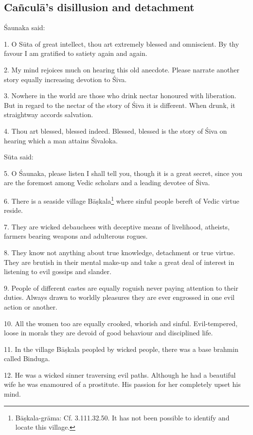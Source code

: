 {}
\subsection*{Cañculā’s disillusion and detachment}

Śaunaka said:

1. O Sūta of great intellect, thou art extremely blessed and omniscient. By thy
favour I am gratified to satiety again and again.

2. My mind rejoices much on hearing this old anecdote. Please narrate another
story equally increasing devotion to Śiva.

3. Nowhere in the world are those who drink nectar honoured with liberation. But
in regard to the nectar of the story of Śiva it is different. When drunk, it
straightway accords salvation.

4. Thou art blessed, blessed indeed. Blessed, blessed is the story of Śiva on
hearing which a man attains Śivaloka.

Sūta said:

5. O Śaunaka, please listen I shall tell you, though it is a great secret, since
you are the foremost among Vedic scholars and a leading devotee of Śiva.

6. There is a seaside village Bāṣkala\footnote{Bāṣkala-grāma: Cf.
 3.111.32.50. It has not been possible to identify and
locate this village.} where sinful people bereft of Vedic virtue reside.

7. They are wicked debauchees with deceptive means of livelihood, atheists,
farmers bearing weapons and adulterous rogues.

8. They know not anything about true knowledge, detachment or true virtue. They
are brutish in their mental make-up and take a great deal of interest in
listening to evil gossips and slander.

9. People of different castes are equally roguish never paying attention to
their duties. Always drawn to worldly pleasures they are ever engrossed in one
evil action or another.

10. All the women too are equally crooked, whorish and sinful. Evil-tempered,
loose in morals they are devoid of good behaviour and disciplined life.

11. In the village Bāṣkala peopled by wicked people, there was a base brahmin
called Binduga.

12. He was a wicked sinner traversing evil paths. Although he had a beautiful
wife he was enamoured of a prostitute. His passion for her completely upset his
mind.

